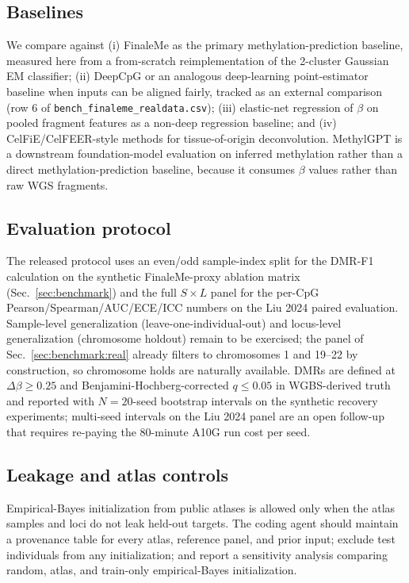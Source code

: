 \subsection{Baselines}
We compare against (i) FinaleMe \citep{liu2024finaleme} as the primary methylation-prediction baseline, measured here from a from-scratch reimplementation of the 2-cluster Gaussian EM classifier; (ii) DeepCpG \citep{angermueller2017deepcpg} or an analogous deep-learning point-estimator baseline when inputs can be aligned fairly, tracked as an external comparison (row 6 of \texttt{bench\_finaleme\_realdata.csv}); (iii) elastic-net regression of $\beta$ on pooled fragment features as a non-deep regression baseline; and (iv) CelFiE/CelFEER-style methods \citep{caggiano2021celfie,keukeleire2023celfeer} for tissue-of-origin deconvolution. MethylGPT \citep{methylgpt2024} is a downstream foundation-model evaluation on inferred methylation rather than a direct methylation-prediction baseline, because it consumes $\beta$ values rather than raw WGS fragments.

\subsection{Evaluation protocol}
The released protocol uses an even/odd sample-index split for the DMR-F1 calculation on the synthetic FinaleMe-proxy ablation matrix (Sec.~\ref{sec:benchmark}) and the full $S\times L$ panel for the per-CpG Pearson/Spearman/AUC/ECE/ICC numbers on the Liu 2024 paired evaluation. Sample-level generalization (leave-one-individual-out) and locus-level generalization (chromosome holdout) remain to be exercised; the panel of Sec.~\ref{sec:benchmark:real} already filters to chromosomes 1 and 19--22 by construction, so chromosome holds are naturally available. DMRs are defined at $\Delta\beta\ge 0.25$ and Benjamini-Hochberg-corrected $q\le 0.05$ in WGBS-derived truth and reported with $N=20$-seed bootstrap intervals on the synthetic recovery experiments; multi-seed intervals on the Liu 2024 panel are an open follow-up that requires re-paying the 80-minute A10G run cost per seed.

\subsection{Leakage and atlas controls}
Empirical-Bayes initialization from public atlases is allowed only when the atlas samples and loci do not leak held-out targets. The coding agent should maintain a provenance table for every atlas, reference panel, and prior input; exclude test individuals from any initialization; and report a sensitivity analysis comparing random, atlas, and train-only empirical-Bayes initialization.

